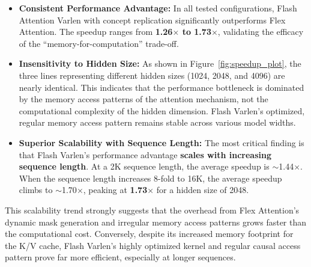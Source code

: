\begin{itemize}
    \item \textbf{Consistent Performance Advantage:} In all tested configurations, Flash Attention Varlen with concept replication significantly outperforms Flex Attention. The speedup ranges from \textbf{1.26$\times$ to 1.73$\times$}, validating the efficacy of the ``memory-for-computation'' trade-off.

    \item \textbf{Insensitivity to Hidden Size:} As shown in Figure~\ref{fig:speedup_plot}, the three lines representing different hidden sizes (1024, 2048, and 4096) are nearly identical. This indicates that the performance bottleneck is dominated by the memory access patterns of the attention mechanism, not the computational complexity of the hidden dimension. Flash Varlen's optimized, regular memory access pattern remains stable across various model widths.

    \item \textbf{Superior Scalability with Sequence Length:} The most critical finding is that Flash Varlen's performance advantage \textbf{scales with increasing sequence length}. At a 2K sequence length, the average speedup is $\sim$1.44$\times$. When the sequence length increases 8-fold to 16K, the average speedup climbs to $\sim$1.70$\times$, peaking at \textbf{1.73$\times$} for a hidden size of 2048.
\end{itemize}

This scalability trend strongly suggests that the overhead from Flex Attention's dynamic mask generation and irregular memory access patterns grows faster than the computational cost. Conversely, despite its increased memory footprint for the K/V cache, Flash Varlen's highly optimized kernel and regular causal access pattern prove far more efficient, especially at longer sequences.